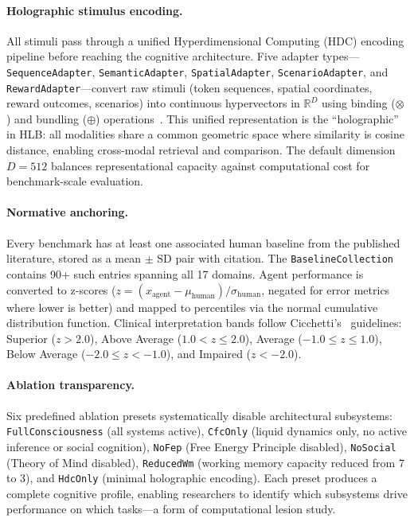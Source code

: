 \documentclass[11pt,letterpaper]{article}
\newcommand{\bind}{\otimes}
\newcommand{\bundle}{\oplus}
\newcommand{\hlb}{\textsc{HLB}}
\begin{document}
\paragraph{Holographic stimulus encoding.} All stimuli pass through a unified Hyperdimensional Computing (HDC) encoding pipeline before reaching the cognitive architecture. Five adapter types---\texttt{SequenceAdapter}, \texttt{SemanticAdapter}, \texttt{SpatialAdapter}, \texttt{ScenarioAdapter}, and \texttt{RewardAdapter}---convert raw stimuli (token sequences, spatial coordinates, reward outcomes, scenarios) into continuous hypervectors in $\mathbb{R}^D$ using binding ($\bind$) and bundling ($\bundle$) operations~\citep{kleyko2023survey}. This unified representation is the ``holographic'' in \hlb{}: all modalities share a common geometric space where similarity is cosine distance, enabling cross-modal retrieval and comparison. The default dimension $D = 512$ balances representational capacity against computational cost for benchmark-scale evaluation.

\paragraph{Normative anchoring.} Every benchmark has at least one associated human baseline from the published literature, stored as a mean $\pm$ SD pair with citation. The \texttt{BaselineCollection} contains 90+ such entries spanning all 17 domains. Agent performance is converted to z-scores ($z = (x_{\text{agent}} - \mu_{\text{human}}) / \sigma_{\text{human}}$, negated for error metrics where lower is better) and mapped to percentiles via the normal cumulative distribution function. Clinical interpretation bands follow Cicchetti's~\citep{cicchetti1994guidelines} guidelines: Superior ($z > 2.0$), Above Average ($1.0 < z \leq 2.0$), Average ($-1.0 \leq z \leq 1.0$), Below Average ($-2.0 \leq z < -1.0$), and Impaired ($z < -2.0$).

\paragraph{Ablation transparency.} Six predefined ablation presets systematically disable architectural subsystems: \texttt{FullConsciousness} (all systems active), \texttt{CfcOnly} (liquid dynamics only, no active inference or social cognition), \texttt{NoFep} (Free Energy Principle disabled), \texttt{NoSocial} (Theory of Mind disabled), \texttt{ReducedWm} (working memory capacity reduced from 7 to 3), and \texttt{HdcOnly} (minimal holographic encoding). Each preset produces a complete cognitive profile, enabling researchers to identify which subsystems drive performance on which tasks---a form of computational lesion study.
\end{document}
